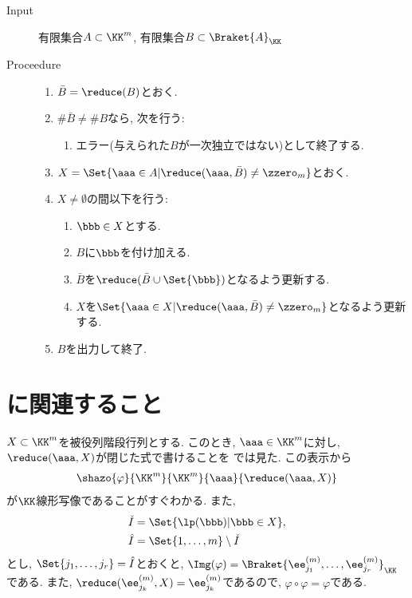 \begin{algorithm}\makebox{}
\begin{description}
\item[Input]
  有限集合$A\subset \KK^m$,
  有限集合$B\subset \Braket{A}_{\KK}$
\item[Proceedure]\makebox{}
  \begin{enumerate}
  \item $\bar B=\reduce(B)$とおく.
  \item $\#\bar B \neq \# B$なら, 次を行う:
    \begin{enumerate}
    \item エラー(与えられた$B$が一次独立ではない)として終了する.
    \end{enumerate}
  \item $X=\Set{ \aaa\in A|\reduce(\aaa,\bar B)\neq \zzero_m}$とおく.
  \item $X\neq\emptyset$の間以下を行う:
    \begin{enumerate}
    \item $\bbb\in X$とする.
    \item $B$に$\bbb$を付け加える.
    \item $\bar B$を$\reduce(\bar B\cup \Set{\bbb})$となるよう更新する.
    \item $X$を$\Set{\aaa\in X| \reduce(\aaa,\bar B)\neq \zzero_m}$となるよう更新する.
    \end{enumerate}
  \item $B$を出力して終了.
  \end{enumerate}
\end{description}
\end{algorithm}

\section{に関連すること}

$X\subset\KK^m$を被役列階段行列とする.
このとき, $\aaa\in\KK^m$に対し,
$\reduce(\aaa,X)$が閉じた式で書けることを
では見た.
この表示から
\begin{align*}
  \shazo{\varphi}{\KK^m}{\KK^m}
        {\aaa}{\reduce(\aaa,X)}
\end{align*}
が$\KK$線形写像であることがすぐわかる.
また,
\begin{align*}
  \check I&=\Set{\lp(\bbb)|\bbb\in X},\\
  \hat I&=\Set{1,\ldots,m}\setminus\check I
\end{align*}
とし,
$\Set{j_1,\ldots,j_r}=\hat I$とおくと,
$\Img(\varphi)=\Braket{\ee^{(m)}_{j_1},\ldots,\ee^{(m)}_{j_r}}_{\KK}$である.
また, $\reduce(\ee^{(m)}_{j_k},X)=\ee^{(m)}_{j_k}$であるので,
$\varphi\circ\varphi=\varphi$である.


